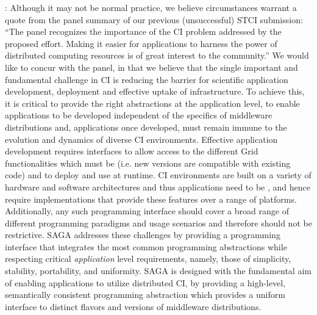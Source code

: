\documentclass[10pt,letterpaper]{article}
\begin{document}

: Although it may not be normal practice, we
believe circumstances warrant a quote from the panel summary of our
previous (unsuccessful) STCI submission: ``The panel recognizes the
importance of the CI problem addressed by the proposed effort. Making
it easier for applications to harness the power of distributed
computing resources is of great interest to the community.''  We would
like to concur with the panel, in that we believe that the single
important and fundamental challenge in CI is reducing the barrier for
scientific application development, deployment and effective uptake of
infrastructure. To achieve this, it is critical to provide the right
abstractions at the application level, to enable applications to be
developed independent of the specifics of middleware distributions
and, applications once developed, must remain immune to the evolution
and dynamics of diverse CI environments.  Effective application
development requires  interfaces to allow  access
to the different Grid functionalities which must be 
(i.e. new versions are compatible with existing code) and  to
deploy and use at runtime.  CI environments are built on a variety of
hardware and software architectures and thus applications need to be
, and hence require implementations that provide these
features over a range of platforms.  Additionally, any such
programming interface should cover a broad range of different
programming paradigms and usage scenarios and therefore should not be
restrictive.  SAGA addresses these challenges by providing a
programming interface that integrates the most common programming
abstractions while respecting critical {\it application} level
requirements, namely, those of simplicity, stability, portability, and
uniformity.  SAGA is designed with the fundamental aim of enabling
applications to utilize distributed CI, by providing a high-level,
semantically consistent programming abstraction which provides a
uniform interface to distinct flavors and versions of middleware
distributions. 
\end{document}
